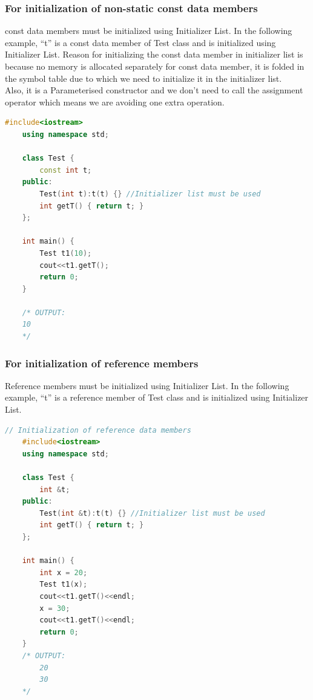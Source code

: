 \documentclass[12pt , a4paper]{article}
\begin{document}
	\subsubsection{For initialization of non-static const data members}
const data members must be initialized using Initializer List. In the following example, “t” is a const data member of Test class and is initialized using Initializer List. Reason for initializing the const data member in initializer list is because no memory is allocated separately for const data member, it is folded in the symbol table due to which we need to initialize it in the initializer list. \\
Also, it is a Parameterised constructor and we don’t need to call the assignment operator which means we are avoiding one extra operation. \\
	\begin{lstlisting}[language=C++]
	#include<iostream>
	using namespace std;
	
	class Test {
		const int t;
	public:
		Test(int t):t(t) {} //Initializer list must be used
		int getT() { return t; }
	};
	
	int main() {
		Test t1(10);
		cout<<t1.getT();
		return 0;
	}
	
	/* OUTPUT:
	10
	*/
	\end{lstlisting}
	\subsubsection{For initialization of reference members}
	Reference members must be initialized using Initializer List. In the following example, “t” is a reference member of Test class and is initialized using Initializer List.\\
	\begin{lstlisting}[language=C++]
	// Initialization of reference data members
	#include<iostream>
	using namespace std;
	
	class Test {
		int &t;
	public:
		Test(int &t):t(t) {} //Initializer list must be used
		int getT() { return t; }
	};
	
	int main() {
		int x = 20;
		Test t1(x);
		cout<<t1.getT()<<endl;
		x = 30;
		cout<<t1.getT()<<endl;
		return 0;
	}
	/* OUTPUT:
		20
		30
	*/
	

	\end{lstlisting}
\end{document}
